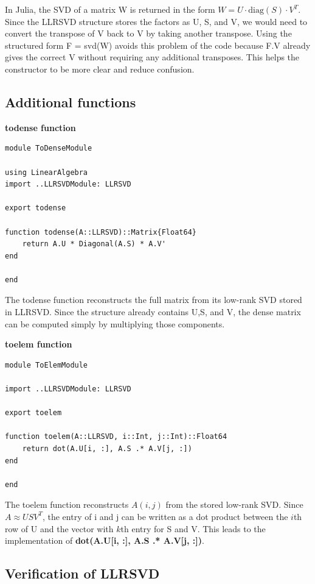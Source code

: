 \documentclass[11pt]{report}
\begin{document}
In Julia, the SVD of a matrix W is returned in the form 
$W = U \cdot \mathrm{diag}(S) \cdot V^T$.  Since the LLRSVD structure stores the factors as U, S, and V, we would need to convert the transpose of V back to V by taking another transpose. Using the structured form F = svd(W) avoids this problem of the code because F.V already gives the correct V without requiring any additional transposes. This helps the constructor to be more clear and reduce confusion.

\subsection{Additional functions}
\textbf{todense function}
\begin{lstlisting}
module ToDenseModule

using LinearAlgebra
import ..LLRSVDModule: LLRSVD

export todense

function todense(A::LLRSVD)::Matrix{Float64}
    return A.U * Diagonal(A.S) * A.V'
end

end 

\end{lstlisting}

The todense function reconstructs the full matrix from its low-rank SVD stored in LLRSVD. Since the structure already contains U,S, and V, the dense matrix can be computed simply by multiplying those components.

\textbf{toelem function}

\begin{lstlisting}
module ToElemModule

import ..LLRSVDModule: LLRSVD

export toelem

function toelem(A::LLRSVD, i::Int, j::Int)::Float64
    return dot(A.U[i, :], A.S .* A.V[j, :])
end

end
\end{lstlisting}

The toelem function reconstructs $A(i,j)$ from the stored low-rank SVD. Since $A \approx USV^T$, the entry of i and j can be written as a dot product between the $i$th row of U and the vector with $k$th entry for S and V. This leads to the implementation of \textbf{dot(A.U[i, :], A.S .* A.V[j, :])}.
\vspace{1.5em}

\subsection{Verification of LLRSVD}
\end{document}
